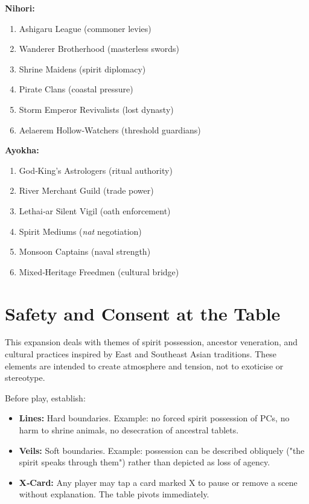 \documentclass[12pt]{book}
\begin{document}
\textbf{Nihori:}
\begin{enumerate}[label=\arabic*.]
    \item Ashigaru League (commoner levies)
    \item Wanderer Brotherhood (masterless swords)
    \item Shrine Maidens (spirit diplomacy)
    \item Pirate Clans (coastal pressure)
    \item Storm Emperor Revivalists (lost dynasty)
    \item Aelaerem Hollow‑Watchers (threshold guardians)
\end{enumerate}

\textbf{Ayokha:}
\begin{enumerate}[label=\arabic*.]
    \item God‑King's Astrologers (ritual authority)
    \item River Merchant Guild (trade power)
    \item Lethai‑ar Silent Vigil (oath enforcement)
    \item Spirit Mediums (\textit{nat} negotiation)
    \item Monsoon Captains (naval strength)
    \item Mixed‑Heritage Freedmen (cultural bridge)
\end{enumerate}

\chapter{Safety and Consent at the Table}
This expansion deals with themes of spirit possession, ancestor veneration, and cultural practices inspired by East and Southeast Asian traditions. These elements are intended to create atmosphere and tension, not to exoticise or stereotype.

Before play, establish:
\begin{itemize}
    \item \textbf{Lines:} Hard boundaries. Example: no forced spirit possession of PCs, no harm to shrine animals, no desecration of ancestral tablets.
    \item \textbf{Veils:} Soft boundaries. Example: possession can be described obliquely ("the spirit speaks through them") rather than depicted as loss of agency.
    \item \textbf{X‑Card:} Any player may tap a card marked X to pause or remove a scene without explanation. The table pivots immediately.
\end{itemize}
\end{document}
